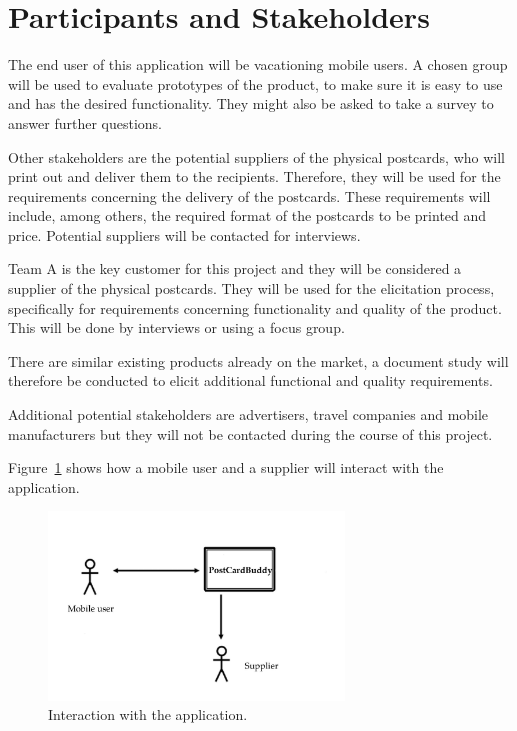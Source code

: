 \documentclass[10pt,a4paper]{article}
\begin{document}
\section{Participants and Stakeholders}

The end user of this application will be vacationing mobile users. A chosen group will be used to evaluate prototypes of the product, to make sure it is easy to use and has the desired functionality. They might also be asked to take a survey to answer further questions.

Other stakeholders are the potential suppliers of the physical postcards, who will print out and deliver them to the recipients. Therefore, they will be used for the requirements concerning the delivery of the postcards. These requirements will include, among others, the required format of the postcards to be printed and price. Potential suppliers will be contacted for interviews.

Team A is the key customer for this project and they will be considered a supplier of the physical postcards. They will be used for the elicitation process, specifically for requirements concerning functionality and quality of the product. This will be done by interviews or using a focus group. 

There are similar existing products already on the market, a document study will therefore be conducted to elicit additional functional and quality requirements. 

Additional potential stakeholders are advertisers, travel companies and mobile manufacturers but they will not be contacted during the course of this project.

Figure~\ref{fig:stake} shows how a mobile user and a supplier will interact with the application. 

\begin{figure}[h!]
\centering
\includegraphics[width=0.7\textwidth]{im.jpg}
\caption{Interaction with the application.}
\label{fig:stake}
\end{figure}
\end{document}
